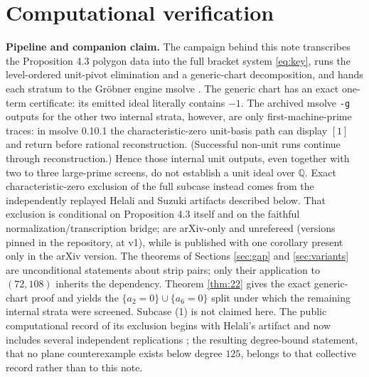 \documentclass[11pt]{article}
\theoremstyle{definition}
\theoremstyle{remark}
\begin{document}
\section{Computational verification}\label{sec:computation}

\noindent\textbf{Pipeline and companion claim.} The campaign behind this note transcribes the Proposition 4.3 polygon data into the full bracket system \eqref{eq:key}, runs the level-ordered unit-pivot elimination and a generic-chart decomposition, and hands each stratum to the Gr\"obner engine msolve \cite{msolve}. The generic chart has an exact one-term certificate: its emitted ideal literally contains $-1$. The archived msolve \texttt{-g} outputs for the other two internal strata, however, are only first-machine-prime traces: in msolve 0.10.1 the characteristic-zero unit-basis path can display $[1]$ and return before rational reconstruction. (Successful non-unit runs continue through reconstruction.) Hence those internal unit outputs, even together with two to three large-prime screens, do not establish a unit ideal over $\mathbb{Q}$. Exact characteristic-zero exclusion of the full subcase instead comes from the independently replayed Helali and Suzuki artifacts described below. That exclusion is conditional on Proposition 4.3 itself and on the faithful normalization/transcription bridge; \cite{GGV2,GGV3,GGV4,GGHV} are arXiv-only and unrefereed (versions pinned in the repository, \cite{GGHV} at v1), while \cite{GGV1} is published with one corollary present only in the arXiv version. The theorems of Sections \ref{sec:gap} and \ref{sec:variants} are unconditional statements about strip pairs; only their application to $(72,108)$ inherits the dependency. Theorem \ref{thm:22} gives the exact generic-chart proof and yields the $\{a_2=0\}\cup\{a_6=0\}$ split under which the remaining internal strata were screened. Subcase (1) is not claimed here. The public computational record of its exclusion begins with Helali's artifact \cite{Helali} and now includes several independent replications \cite{Suzuki,Strinz,Ishihara}; the resulting degree-bound statement, that no plane counterexample exists below degree $125$, belongs to that collective record rather than to this note.
\end{document}
